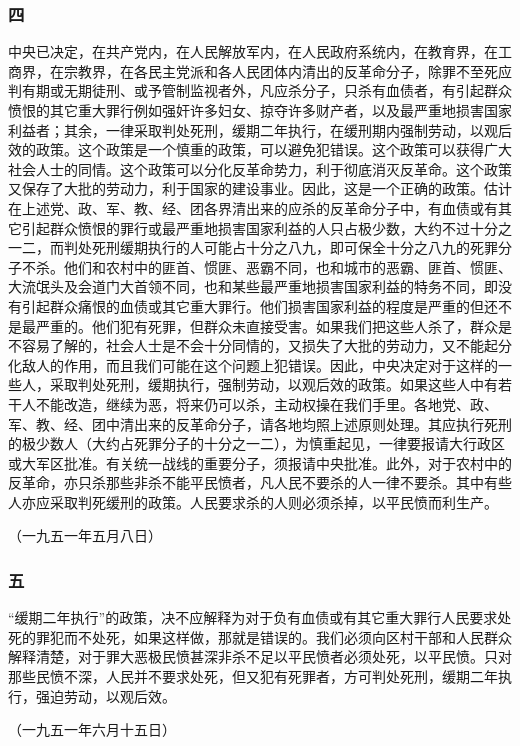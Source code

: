 \documentclass[cn,11pt,chinese]{elegantbook}
\def\myformat#1{\hfil\hfil #1}
\begin{document}
\subsubsection*{\myformat{四}}
中央已决定，在共产党内，在人民解放军内，在人民政府系统内，在教育界，在工商界，在宗教界，在各民主党派和各人民团体内清出的反革命分子，除罪不至死应判有期或无期徒刑、或予管制监视者外，凡应杀分子，只杀有血债者，有引起群众愤恨的其它重大罪行例如强奸许多妇女、掠夺许多财产者，以及最严重地损害国家利益者；其余，一律采取判处死刑，缓期二年执行，在缓刑期内强制劳动，以观后效的政策。这个政策是一个慎重的政策，可以避免犯错误。这个政策可以获得广大社会人士的同情。这个政策可以分化反革命势力，利于彻底消灭反革命。这个政策又保存了大批的劳动力，利于国家的建设事业。因此，这是一个正确的政策。估计在上述党、政、军、教、经、团各界清出来的应杀的反革命分子中，有血债或有其它引起群众愤恨的罪行或最严重地损害国家利益的人只占极少数，大约不过十分之一二，而判处死刑缓期执行的人可能占十分之八九，即可保全十分之八九的死罪分子不杀。他们和农村中的匪首、惯匪、恶霸不同，也和城市的恶霸、匪首、惯匪、大流氓头及会道门大首领不同，也和某些最严重地损害国家利益的特务不同，即没有引起群众痛恨的血债或其它重大罪行。他们损害国家利益的程度是严重的但还不是最严重的。他们犯有死罪，但群众未直接受害。如果我们把这些人杀了，群众是不容易了解的，社会人士是不会十分同情的，又损失了大批的劳动力，又不能起分化敌人的作用，而且我们可能在这个问题上犯错误。因此，中央决定对于这样的一些人，采取判处死刑，缓期执行，强制劳动，以观后效的政策。如果这些人中有若干人不能改造，继续为恶，将来仍可以杀，主动权操在我们手里。各地党、政、军、教、经、团中清出来的反革命分子，请各地均照上述原则处理。其应执行死刑的极少数人（大约占死罪分子的十分之一二），为慎重起见，一律要报请大行政区或大军区批准。有关统一战线的重要分子，须报请中央批准。此外，对于农村中的反革命，亦只杀那些非杀不能平民愤者，凡人民不要杀的人一律不要杀。其中有些人亦应采取判死缓刑的政策。人民要求杀的人则必须杀掉，以平民愤而利生产。\\
\begin{flushright}
（一九五一年五月八日）
\end{flushright}
\subsubsection*{\myformat{五}}
“缓期二年执行”的政策，决不应解释为对于负有血债或有其它重大罪行人民要求处死的罪犯而不处死，如果这样做，那就是错误的。我们必须向区村干部和人民群众解释清楚，对于罪大恶极民愤甚深非杀不足以平民愤者必须处死，以平民愤。只对那些民愤不深，人民并不要求处死，但又犯有死罪者，方可判处死刑，缓期二年执行，强迫劳动，以观后效。\\
\begin{flushright}
（一九五一年六月十五日）
\end{flushright}
\end{document}
